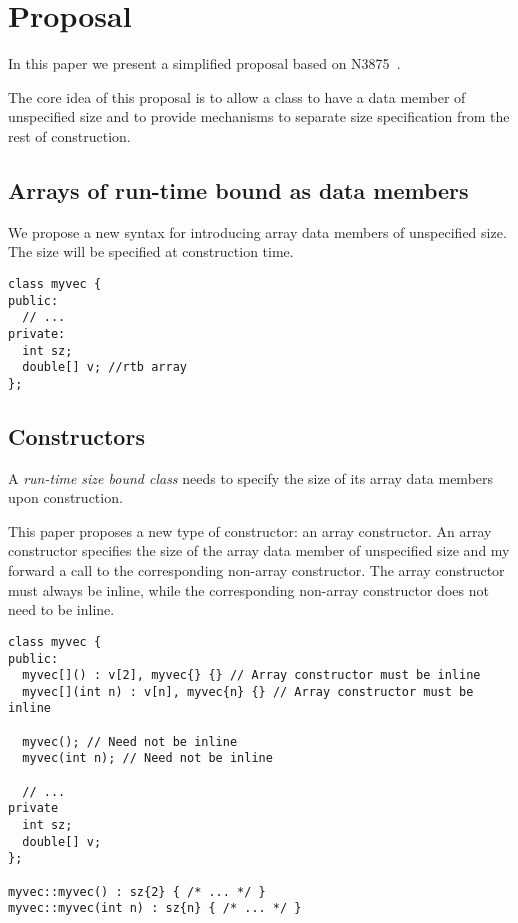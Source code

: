 \section{Proposal}

In this paper we present a simplified proposal based on N3875~\cite{n3875}.

The core idea of this proposal is to allow a class to have a data member of
unspecified size and to provide mechanisms to separate size specification
from the rest of construction.

\subsection{Arrays of run-time bound as data members}

We propose a new syntax for introducing array data members of unspecified size.
The size will be specified at construction time.

\begin{lstlisting}
class myvec {
public:
  // ...
private:
  int sz;
  double[] v; //rtb array
};
\end{lstlisting}

\subsection{Constructors}

A \emph{run-time size bound class} needs to specify the size of its array data
members upon construction.

This paper proposes a new type of constructor: an array constructor. An array
constructor specifies the size of the array data member of unspecified size and
my forward a call to the corresponding non-array constructor. The array
constructor must always be inline, while the corresponding non-array
constructor does not need to be inline.

\begin{lstlisting}
class myvec {
public:
  myvec[]() : v[2], myvec{} {} // Array constructor must be inline
  myvec[](int n) : v[n], myvec{n} {} // Array constructor must be inline

  myvec(); // Need not be inline
  myvec(int n); // Need not be inline

  // ...
private
  int sz;
  double[] v;
};

myvec::myvec() : sz{2} { /* ... */ }
myvec::myvec(int n) : sz{n} { /* ... */ }
\end{lstlisting}


